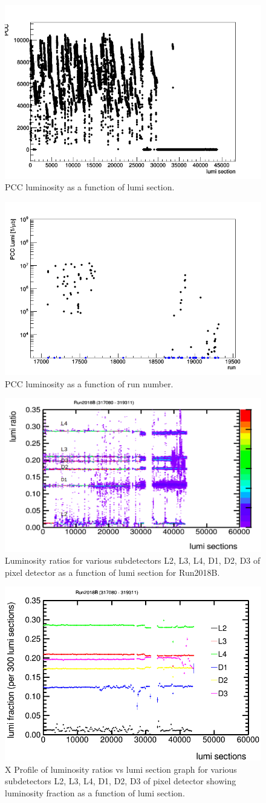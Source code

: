 \begin{figure}[H]
  \centering
  \includegraphics[width=0.52\columnwidth]{./ls_lumi_2018B.png}
  \caption{PCC luminosity as a function of lumi section.}
  \label{fig:CMS}
\end{figure}


\begin{figure}[H]
  \centering
  \includegraphics[width=0.52\columnwidth]{./runs_2018B.png}
  \caption{PCC luminosity as a function of run number.}
  \label{fig:CMS}
\end{figure}


\begin{figure}[H]
  \centering
  \includegraphics[width=0.52\columnwidth]{./2018B_lumiratio.png}
  \caption{Luminosity ratios for various subdetectors L2, L3, L4, D1, D2, D3 of pixel detector as a function of lumi section for Run2018B.}
  \label{fig:CMS}
\end{figure}



\begin{figure}[H]
  \centering
  \includegraphics[width=0.5\columnwidth]{./ProfileXcombinedB_new.png}
  \caption{X Profile of luminosity ratios vs lumi section graph for various subdetectors L2, L3, L4, D1, D2, D3 of pixel detector showing luminosity fraction as a function of lumi section.}
  \label{fig:CMS}
\end{figure}



